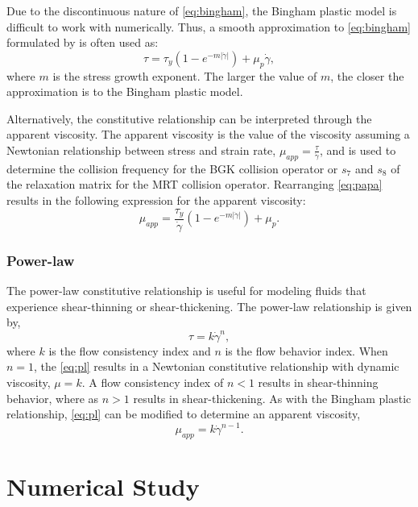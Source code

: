 \documentclass[pdftex,ms]{pittetd}
\begin{document}
Due to the discontinuous nature of \eqref{eq:bingham}, the Bingham plastic model is difficult to work with numerically.
Thus, a smooth approximation to \eqref{eq:bingham} formulated by \citet{papanastasiou1987flows} is often used as:
\begin{equation} \label{eq:papa}
\tau = \tau_y (1 - e^{-m |\dot{\gamma}|}) + \mu_p \dot{\gamma},
\end{equation}
\noindent where $m$ is the stress growth exponent.
The larger the value of $m$, the closer the approximation is to the Bingham plastic model.

Alternatively, the constitutive relationship can be interpreted through the apparent viscosity.
The apparent viscosity is the value of the viscosity assuming a Newtonian relationship between stress and strain rate, $\mu_{app} = \frac{\tau}{\dot{\gamma}}$, and is used to determine the collision frequency for the BGK collision operator or $s_7$ and $s_8$ of the relaxation matrix for the MRT collision operator.
Rearranging \eqref{eq:papa} results in the following expression for the apparent viscosity:
\begin{equation} \label{eq:bing-mu-app}
\mu_{app} = \frac{\tau_y}{\dot{\gamma}} (1 - e^{-m |\dot{\gamma}|}) + \mu_p.
\end{equation}

\subsubsection{Power-law}

The power-law constitutive relationship is useful for modeling fluids that experience shear-thinning or shear-thickening.
The power-law relationship is given by,
\begin{equation} \label{eq:pl}
\tau = k \dot{\gamma}^n,
\end{equation}
\noindent where $k$ is the flow consistency index and $n$ is the flow behavior index.
When $n = 1$, the \eqref{eq:pl} results in a Newtonian constitutive relationship with dynamic viscosity, $\mu = k$.
A flow consistency index of $n < 1$ results in shear-thinning behavior, where as $n > 1$ results in shear-thickening.
As with the Bingham plastic relationship, \eqref{eq:pl} can be modified to determine an apparent viscosity,
\begin{equation} \label{eq:pl-mu-app}
\mu_{app} = k \dot{\gamma}^{n-1}.
\end{equation}

\section{Numerical Study}
\end{document}
